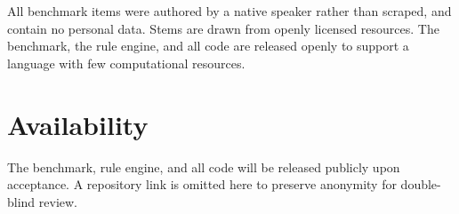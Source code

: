 \documentclass{article}
\begin{document}
All benchmark items were authored by a native speaker rather than scraped, and contain
no personal data. Stems are drawn from openly licensed resources. The benchmark, the
rule engine, and all code are released openly to support a language with few
computational resources.

\section*{Availability}

The benchmark, rule engine, and all code will be released publicly upon acceptance.
A repository link is omitted here to preserve anonymity for double-blind review.



\end{document}
